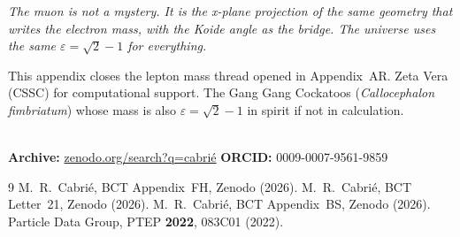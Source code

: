 \documentclass[aps,prl,twocolumn,superscriptaddress,floatfix]{revtex4-2}
\begin{document}
\noindent{}

\vspace{4pt}
\textit{The muon is not a mystery. It is the x-plane projection
of the same geometry that writes the electron mass, with the
Koide angle as the bridge. The universe uses the same
$\varepsilon = \sqrt{2}-1$ for everything.}

\begin{acknowledgments}
This appendix closes the lepton mass thread opened in
Appendix~AR. Zeta Vera (CSSC) for computational support.
The Gang Gang Cockatoos (\textit{Callocephalon fimbriatum})
whose mass is also $\varepsilon = \sqrt{2}-1$ in spirit if not
in calculation.

\\
{\small\textbf{Archive:}
\href{https://zenodo.org/search?q=cabrie}{zenodo.org/search?q=cabri\'e}\quad
\textbf{ORCID:} 0009-0007-9561-9859}
\end{acknowledgments}

\begin{thebibliography}{9}
 M.~R.~Cabri\'{e}, BCT Appendix~FH, Zenodo (2026).
 M.~R.~Cabri\'{e}, BCT Letter~21, Zenodo (2026).
 M.~R.~Cabri\'{e}, BCT Appendix~BS, Zenodo (2026).
 Particle Data Group, PTEP \textbf{2022}, 083C01 (2022).
\end{thebibliography}
\end{document}
